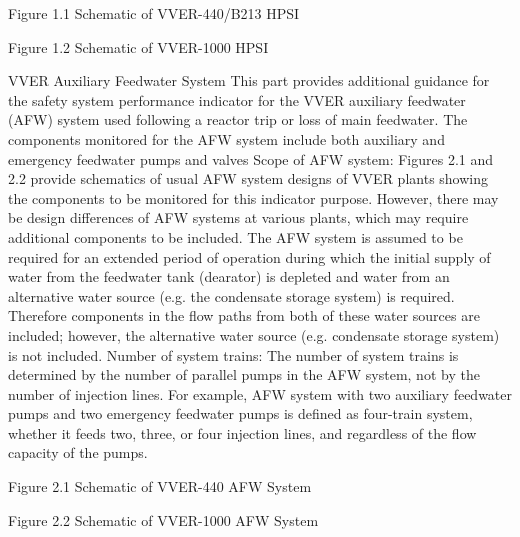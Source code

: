 Figure 1.1 Schematic of VVER-440/B213 HPSI


Figure 1.2 Schematic of VVER-1000 HPSI

VVER Auxiliary Feedwater System
This part provides additional guidance for the safety system performance indicator for the VVER auxiliary feedwater (AFW) system used following a reactor trip or loss of main feedwater.
The components monitored for the AFW system include both auxiliary and emergency feedwater pumps and valves
Scope of AFW system: Figures 2.1 and 2.2 provide schematics of usual AFW system designs of VVER plants showing the components to be monitored for this indicator purpose. However, there may be design differences of AFW systems at various plants, which may require additional components to be included.
The AFW system is assumed to be required for an extended period of operation during which the initial supply of water from the feedwater tank (dearator) is depleted and water from an alternative water source (e.g. the condensate storage system) is required. Therefore components in the flow paths from both of these water sources are included; however, the alternative water source (e.g. condensate storage system) is not included.
Number of system trains:  The number of system trains is determined by the number of parallel pumps in the AFW system, not by the number of injection lines. For example, AFW system with two auxiliary feedwater pumps and two emergency feedwater pumps is defined as four-train system, whether it feeds two, three, or four injection lines, and regardless of the flow capacity of the pumps.


Figure 2.1 Schematic of VVER-440 AFW System


Figure 2.2 Schematic of VVER-1000 AFW System

